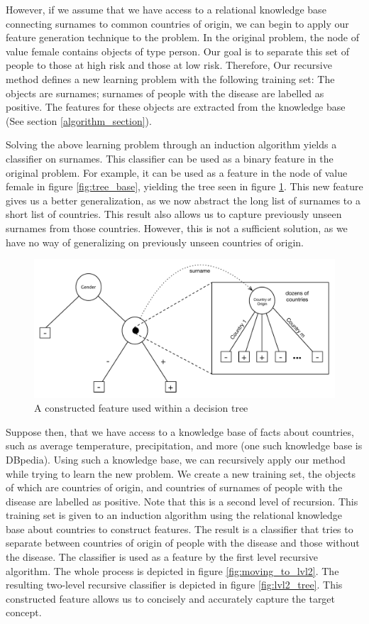 \documentclass[twoside,11pt]{article}
\theoremstyle{definition}
\begin{document}
However, if we assume that we have access to a relational knowledge base connecting surnames to common countries of origin, we can begin to apply our feature generation technique to the problem. In the original problem, the node of value female contains objects of type person. Our goal is to separate this set of people to those at high risk and those at low risk. Therefore, Our recursive method defines a new learning problem with the following training set: The objects are surnames; surnames of people with the disease are labelled as positive. The features for these objects are extracted from the knowledge base (See section \ref{algorithm_section}).

Solving the above learning problem through an induction algorithm yields a classifier on surnames. This classifier can be used as a binary feature in the original problem. For example, it can be used as a feature in the node of value female in figure \ref{fig:tree_base}, yielding the tree seen in figure \ref{fig:lvl1_tree}. This new feature gives us a better generalization, as we now abstract the long list of surnames to a short list of countries. This result also allows us to capture previously unseen surnames from those countries. However, this is not a sufficient solution, as we have no way of generalizing on previously unseen countries of origin.

\begin{figure}
	\centering
	\includegraphics[width=\linewidth]{fig2.pdf}
	\caption{A constructed feature used within a decision tree}
	\label{fig:lvl1_tree}
\end{figure}

Suppose then, that we have access to a knowledge base of facts about countries, such as average temperature, precipitation, and more (one such knowledge base is DBpedia). Using such a knowledge base, we can recursively apply our method while trying to learn the new problem. We create a new training set, the objects of which are countries of origin, and countries of surnames of people with the disease are labelled as positive. Note that this is a second level of recursion. This training set is given to an induction algorithm using the relational knowledge base about countries to construct features. The result is a classifier that tries to separate between countries of origin of people with the disease and those without the disease. The classifier is used as a feature by the first level recursive algorithm. The whole process is depicted in figure \ref{fig:moving_to_lvl2}. The resulting two-level recursive classifier is depicted in figure \ref{fig:lvl2_tree}. This constructed feature allows us to concisely and accurately capture the target concept.
\end{document}
